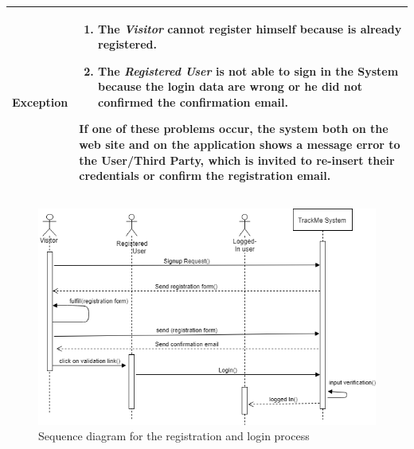\begin{table}[H]
\begin{tabular}{|p{3.5cm}|p{10.3cm}|}
    \hline
    \textbf{\large{Exception}} 			& \begin{enumerate}[leftmargin=0.5cm]
                                          	\item The \emph{Visitor} cannot register himself because is already registered.
                                          	\item The \emph{Registered User} is not able to sign in the System because the login data are wrong or he did not confirmed the confirmation email.
                                            \end{enumerate}
    										If one of these problems occur, the system both on the web site and on the application shows a message error to the User/Third Party, which is invited to re-insert their credentials or confirm the registration email.\\
    
    \hline
    
    \end{tabular}
	
\end{table}
\begin{figure}[H]

    \centering
    \includegraphics[scale=0.4]{./Pictures/login1.png}
    \caption{Sequence diagram for the registration and login process}
    
\end{figure}

